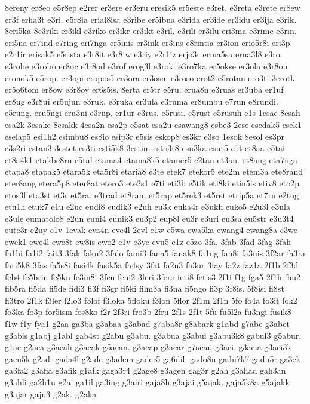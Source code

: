 {8ereny er8eo e5r8ep e2rer er3ere er3eru eresik5 er5este e3ret. e3reta
e3rete er8ew er3f erha3t e3ri. e5r8ia erial8isa e3ribe er5ibua e3rida
er3ide er3idu er3ija e3rik. 8eri5ka 8e3riki er3ikl e3riko er3ikr er3ikt
e3ril. e3rili er3ilu eri3ma e3rime e3rin. eri5na er7ind e7ring eri7nga
er5inis er3ink er3ins e8rintia er3ion erio5r8i eri3p e2r1ir erisak5
e5rista e3r8it e3r8iw e3riy e2r1iz erjo3r erma5sa erna3l8 e3ro. e3robe
e3robo er8oc e3r8od e3rof erog3l e3rok. e3ro7ka er5okse er3ola e3r8on
eronok5 e5rop. er3opi eropos5 er3ora er3osm e3roso erot2 e5rotan ero3ti
3erotk er5o6tom er8ow e3r8oy er6s5is. 8erta er5tr e5ru. erua8n e3ruas
er3uba er1uf er8ug e3r8ui er5ujun e3ruk. e3ruka er3ula e3ruma er8umbu
e7run e8rundi. e5rung. eru5ngi eru3ni e3rup. er1ur e3rus. e5rusi. e5rust
e5rusuh e1s 1esae 8esah esa2k 3esake 8esakk 4esa2n esa2p e5sat esa2u
esawang8 esbe3 2ese esedak5 esek1 eselap5 esi1h2 esimbu8 es8io esip3r
e5sis eskop8 es3kr e3so 1esok 8esol es3pr e3s2ri estan3 3estet es3ti
esti5k8 3estim esto3r8 esu3ka esut5 e1t et8aa e5tai et8a4k1 etakbe8ru
e5tal etama4 etama8k5 etamer5 e2tan et3an. et8ang eta7nga etapa8 etapak5
etara5k eta5r8i etaria8 e3te etek7 etekor5 ete2m etem3a ete8rand eter8ang
etera5p8 eter8at etero3 ete2s1 e7ti eti3b e5tik eti8ki etin5is etiv8 eto2p
etos3f eto3st et3r et5ra. e3trad et8ram et5rap et5rek3 et5ret etrip5a
et7ru e2tug etu1h etuk7 e1u e2uc eudi8 eudik3 e2uh eu3k euka4r e3ukh euko5
e2u3l e3ula e3ule eumatolo8 e2un euni4 eunik3 eu3p2 eup8l eu3r e3uri eu3sa
eu5str e3u3t4 eute3r e2uy e1v 1evak eva4n eve4l 2evl e1w e5wa ewa5ka
ewang4 ewang8a e3we ewek1 ewe4l ewe8t ew8is ewo2 e1y e3ye eyu5 e1z e5zo
3fa. 3fab 3fad 3fag 3fah fa1hi fa1i2 fait3 3fak faku2 3falo fami3 fana5
fanak8 fa1ng fan8i fa3nis 3f2ar fa3ra fari5k8 3fas fa5s8i fasi4k fasik5a
fa4sy 3fat fa2u3 fa3ur 3fay fa2z faz1a 2f1b 2f3d feb4 fe5brin fe5ku fe3m8i
3fen feni2 3feri 3fero feti8 fetis3 2f1f f1g fga5 2f1h fhu2 fib5ra fi5da
fi5de fidi3 fi3f fi3gr fi5ki film3a fi3na fi5ngo fi3p 3f8is. 5f8isi fi8st
fi3tro 2f1k f3ler f2lo3 f3lof f3loka 5floku f3lon 5flor 2f1m 2f1n 5fo fo4a
fo3it fok2 fo3ka fo3p for5ism fos8ko f2r 2f3ri fro3b 2fru 2f1s 2f1t 5fu
fu5l2a fu3ngi fusik8 f1w f1y fya1 g2aa ga3ba g3abaa g3abad g7aba8r g8abark
g1abd g7abe g3abet g3abis g1abj g1abl gab4st g2abu g3abu. g3abua g3abui
g3abu3k8 gabul3 g5abur. g1ac g2aca g3acah g3acak g5acan. g3acap g3acar
g7acau g3aci. g3acia g3aci3k gacu5k g2ad. gada4l g2ade g3adem gader5
ga6dil. gado8n gadu7k7 gadu5r ga3ek ga3fa2 g3afia g3afik g1afk gaga3r4
g2age8 g3agen gag3r g2ah g3ahad gah3an g3ahli ga2h1u g2ai ga1il ga3ing
g3airi gaja8h g3ajai g5ajak. gaja5k8a g5ajakk g3ajar gaju3 g2ak. g2aka
}
